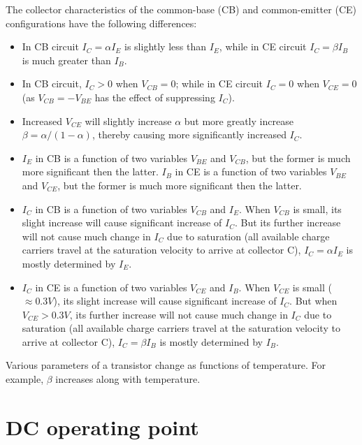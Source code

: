 The collector characteristics of the common-base (CB) and common-emitter 
(CE) configurations have the following differences:
\begin{itemize}
\item In CB circuit $I_C=\alpha I_E$ is slightly less than $I_E$, while 
  in CE circuit $I_C=\beta I_B$ is much greater than $I_B$.
\item In CB circuit, $I_C>0$ when $V_{CB}=0$; while in CE circuit $I_C=0$
  when $V_{CE}=0$ (as $V_{CB}=-V_{BE}$ has the effect of suppressing $I_C$).
\item Increased $V_{CE}$ will slightly increase $\alpha$ but more
  greatly increase $\beta=\alpha/(1-\alpha)$, thereby causing more 
  significantly increased $I_C$.
\item $I_E$ in CB is a function of two variables $V_{BE}$ and $V_{CB}$,
  but the former is much more significant then the latter.
  $I_B$ in CE is a function of two variables $V_{BE}$ and $V_{CE}$,
  but the former is much more significant then the latter.
\item $I_C$ in CB is a function of two variables $V_{CB}$ and $I_E$. 
  When $V_{CB}$ is small, its slight increase will cause significant increase 
  of $I_C$. But its further increase will not cause much change in $I_C$ due 
  to saturation (all available charge carriers travel at the saturation velocity
  to arrive at collector C), $I_C=\alpha I_E$ is mostly determined by $I_E$.
\item $I_C$ in CE is a function of two variables $V_{CE}$ and $I_B$. 
  When $V_{CE}$ is small ($\approx 0.3V$), its slight increase will cause 
  significant increase of $I_C$. But when $V_{CE}>0.3V$, its further increase 
  will not cause much change in $I_C$ due to saturation (all available charge 
  carriers travel at the saturation velocity to arrive at collector C), 
  $I_C=\beta I_B$ is mostly determined by $I_B$.
\end{itemize}



Various parameters of a transistor change as functions of temperature. 
For example, $\beta$ increases along with temperature.

\section*{DC operating point}


